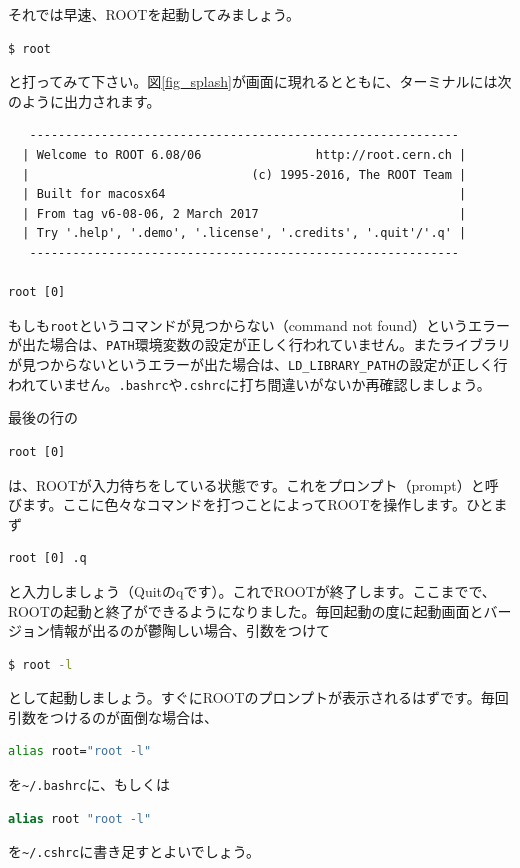 それでは早速、ROOTを起動してみましょう。
\begin{lstlisting}[language=bash]
$ root
\end{lstlisting}
と打ってみて下さい。図\ref{fig_splash}が画面に現れるとともに、ターミナルには次のように出力されます。
\begin{lstlisting}
   ------------------------------------------------------------
  | Welcome to ROOT 6.08/06                http://root.cern.ch |
  |                               (c) 1995-2016, The ROOT Team |
  | Built for macosx64                                         |
  | From tag v6-08-06, 2 March 2017                            |
  | Try '.help', '.demo', '.license', '.credits', '.quit'/'.q' |
   ------------------------------------------------------------

root [0] 
\end{lstlisting}
もしも\texttt{root}というコマンドが見つからない（command not found）というエラーが出た場合は、\texttt{PATH}環境変数の設定が正しく行われていません。またライブラリが見つからないというエラーが出た場合は、\texttt{LD\_LIBRARY\_PATH}の設定が正しく行われていません。\texttt{.bashrc}や\texttt{.cshrc}に打ち間違いがないか再確認しましょう。

最後の行の
\begin{lstlisting}
root [0]
\end{lstlisting}
は、ROOTが入力待ちをしている状態です。これをプロンプト（prompt）と呼びます。ここに色々なコマンドを打つことによってROOTを操作します。ひとまず
\begin{lstlisting}
root [0] .q
\end{lstlisting}
と入力しましょう（Quitのqです）。これでROOTが終了します。ここまでで、ROOTの起動と終了ができるようになりました。毎回起動の度に起動画面とバージョン情報が出るのが鬱陶しい場合、引数をつけて
\begin{lstlisting}[language=bash]
$ root -l
\end{lstlisting}
として起動しましょう。すぐにROOTのプロンプトが表示されるはずです。毎回引数をつけるのが面倒な場合は、
\begin{lstlisting}[language=bash]
alias root="root -l"
\end{lstlisting}
を\texttt{\~{}/.bashrc}に、もしくは
\begin{lstlisting}[language=csh]
alias root "root -l"
\end{lstlisting}
を\texttt{\~{}/.cshrc}に書き足すとよいでしょう。

